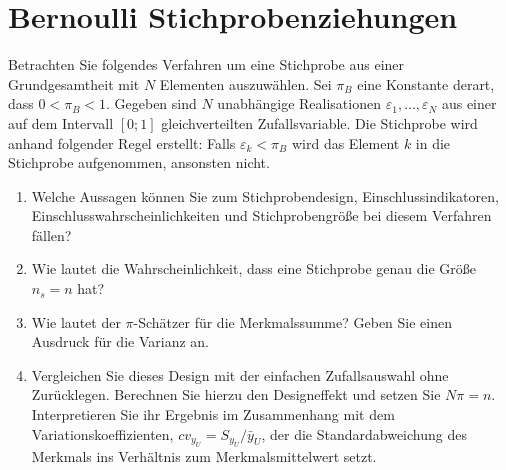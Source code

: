 \documentclass{article}
\begin{document}
\section{Bernoulli Stichprobenziehungen}
Betrachten Sie folgendes Verfahren um eine Stichprobe aus einer Grundgesamtheit mit $N$ Elementen auszuwählen. Sei $\pi_B$ eine Konstante derart, dass $0<\pi_B<1$. Gegeben sind $N$ unabhängige Realisationen $\varepsilon_1,\dots,\varepsilon_N$ aus einer auf dem Intervall $[0;1]$ gleichverteilten Zufallsvariable. Die Stichprobe wird anhand folgender Regel erstellt: Falls $\varepsilon_k<\pi_B$ wird das Element $k$ in die Stichprobe aufgenommen, ansonsten nicht.
\begin{enumerate}
	\item Welche Aussagen können Sie zum Stichprobendesign, Einschlussindikatoren, Einschlusswahrscheinlichkeiten und Stichprobengröße bei diesem Verfahren fällen?
	\item Wie lautet die Wahrscheinlichkeit, dass eine Stichprobe genau die Größe $n_s=n$ hat?
	\item Wie lautet der $\pi$-Schätzer für die Merkmalssumme? Geben Sie einen Ausdruck für die Varianz an.
	\item Vergleichen Sie dieses Design mit der einfachen Zufallsauswahl ohne Zurücklegen. Berechnen Sie hierzu den Designeffekt und setzen Sie $N\pi = n$. Interpretieren Sie ihr Ergebnis im Zusammenhang mit dem Variationskoeffizienten, $cv_{y_U} = S_{y_U}/\bar{y}_U$, der die Standardabweichung des Merkmals ins Verhältnis zum Merkmalsmittelwert setzt.
\end{enumerate}
\end{document}
